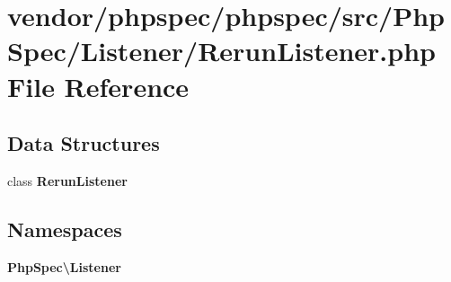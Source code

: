 \section{vendor/phpspec/phpspec/src/\+Php\+Spec/\+Listener/\+Rerun\+Listener.php File Reference}
\label{_rerun_listener_8php}
\subsection*{Data Structures}
\begin{DoxyCompactItemize}
\item 
class {\bf Rerun\+Listener}
\end{DoxyCompactItemize}
\subsection*{Namespaces}
\begin{DoxyCompactItemize}
\item 
 {\bf Php\+Spec\textbackslash{}\+Listener}
\end{DoxyCompactItemize}
